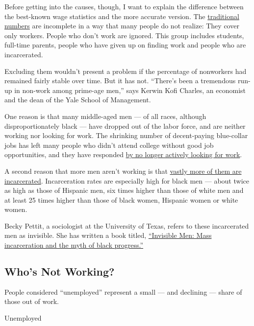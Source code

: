 Before getting into the causes, though, I want to explain the difference
between the best-known wage statistics and the more accurate version.
The
\href{https://web.archive.org/web/20110607035101/http://www.gpoaccess.gov/eop/ca/pdfs/ch4.pdf}{traditional
numbers} are incomplete in a way that many people do not realize: They
cover only workers. People who don't work are ignored. This group
includes students, full-time parents, people who have given up on
finding work and people who are incarcerated.

Excluding them wouldn't present a problem if the percentage of
nonworkers had remained fairly stable over time. But it has not.
``There's been a tremendous run-up in non-work among prime-age men,''
says Kerwin Kofi Charles, an economist and the dean of the Yale School
of Management.

One reason is that many middle-aged men --- of all races, although
disproportionately black --- have dropped out of the labor force, and
are neither working nor looking for work. The shrinking number of
decent-paying blue-collar jobs has left many people who didn't attend
college without good job opportunities, and they have responded
\href{https://obamawhitehouse.archives.gov/sites/default/files/page/files/20160620_cea_primeage_male_lfp.pdf}{by
no longer actively looking for work}.

A second reason that more men aren't working is that
\href{https://sentencingproject.org/wp-content/uploads/2016/01/Trends-in-US-Corrections.pdf}{vastly
more of them are incarcerated}. Incarceration rates are especially high
for black men --- about twice as high as those of Hispanic men, six
times higher than those of white men and at least 25 times higher than
those of black women, Hispanic women or white women.

Becky Pettit, a sociologist at the University of Texas, refers to these
incarcerated men as invisible. She has written a book titled,
\href{https://www.russellsage.org/publications/invisible-men}{``Invisible
Men: Mass incarceration and the myth of black progress.''}

\hypertarget{whos-not-working}{%
\subsection{Who's Not Working?}\label{whos-not-working}}

People considered ``unemployed'' represent a small --- and declining ---
share of those out of work.

Unemployed

